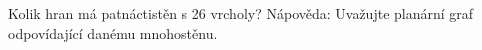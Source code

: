Kolik hran má patnáctistěn s 26 vrcholy? Nápověda: Uvažujte planární graf
odpovídající danému mnohostěnu.
